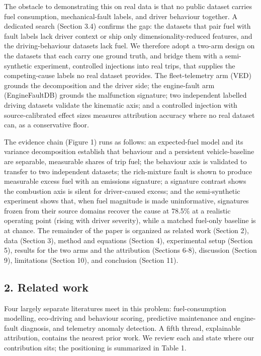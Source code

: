 The obstacle to demonstrating this on real data is that no public
dataset carries fuel consumption, mechanical-fault labels, and driver
behaviour together. A dedicated search (Section 3.4) confirms the gap:
the datasets that pair fuel with fault labels lack driver context or
ship only dimensionality-reduced features, and the driving-behaviour
datasets lack fuel. We therefore adopt a two-arm design on the datasets
that each carry one ground truth, and bridge them with a semi-synthetic
experiment, controlled injections into real trips, that supplies the
competing-cause labels no real dataset provides. The fleet-telemetry arm
(VED) grounds the decomposition and the driver side; the engine-fault
arm (EngineFaultDB) grounds the malfunction signature; two independent
labelled driving datasets validate the kinematic axis; and a controlled
injection with source-calibrated effect sizes measures attribution
accuracy where no real dataset can, as a conservative floor.

The evidence chain (Figure 1) runs as follows: an expected-fuel model
and its variance decomposition establish that behaviour and a persistent
vehicle-baseline are separable, measurable shares of trip fuel; the
behaviour axis is validated to transfer to two independent datasets; the
rich-mixture fault is shown to produce measurable excess fuel with an
emissions signature; a signature contrast shows the combustion axis is
silent for driver-caused excess; and the semi-synthetic experiment shows
that, when fuel magnitude is made uninformative, signatures frozen from
their source domains recover the cause at 78.5\% at a realistic
operating point (rising with driver severity), while a matched fuel-only
baseline is at chance. The remainder of the paper is organized as
related work (Section 2), data (Section 3), method and equations
(Section 4), experimental setup (Section 5), results for the two arms
and the attribution (Sections 6-8), discussion (Section 9), limitations
(Section 10), and conclusion (Section 11).

\subsection{2. Related work}\label{related}

Four largely separate literatures meet in this problem: fuel-consumption
modelling, eco-driving and behaviour scoring, predictive maintenance and
engine-fault diagnosis, and telemetry anomaly detection. A fifth thread,
explainable attribution, contains the nearest prior work. We review each
and state where our contribution sits; the positioning is summarized in
Table 1.

